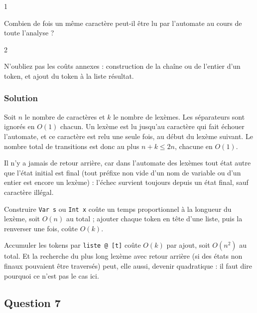 \documentclass[11pt,a4paper]{article}
\newcommand{\equationajustee}[1]{%
  \sbox{\boiteequation}{$\displaystyle #1$}%
  \ifdim\wd\boiteequation>\linewidth
    \[\resizebox{\linewidth}{!}{\usebox{\boiteequation}}\]%
  \else
    \[#1\]%
  \fi}
\begin{document}
\begin{indication}{1}

Combien de fois un même caractère peut-il être lu par l'automate au cours de toute l'analyse ?

\end{indication}

\begin{indication}{2}

N'oubliez pas les coûts annexes : construction de la chaîne ou de l'entier d'un token, et ajout du token à la liste résultat.

\end{indication}

\hypertarget{solution-5}{%
\subsubsection{Solution}\label{solution-5}}

Soit \(n\) le nombre de caractères et \(k\) le nombre de lexèmes. Les séparateurs sont ignorés en \(O(1)\) chacun. Un lexème est lu jusqu'au caractère qui fait échouer l'automate, et ce caractère est relu une seule fois, au début du lexème suivant. Le nombre total de transitions est donc au plus \(n + k \le 2n\), chacune en \(O(1)\).

Il n'y a jamais de retour arrière, car dans l'automate des lexèmes tout état autre que l'état initial est final (tout préfixe non vide d'un nom de variable ou d'un entier est encore un lexème) : l'échec survient toujours depuis un état final, sauf caractère illégal.

Construire \texttt{Var\ s} ou \texttt{Int\ x} coûte un temps proportionnel à la longueur du lexème, soit \(O(n)\) au total ; ajouter chaque token en tête d'une liste, puis la renverser une fois, coûte \(O(k)\).

\equationajustee{\boxed{\,\text{L'analyse lexicale est en } \Theta(n).\,}}

\begin{piege}

Accumuler les tokens par \texttt{liste\ @\ {[}t{]}} coûte \(O(k)\) par ajout, soit \(O(n^2)\) au total. Et la recherche du plus long lexème avec retour arrière (si des états non finaux pouvaient être traversés) peut, elle aussi, devenir quadratique : il faut dire pourquoi ce n'est pas le cas ici.

\end{piege}

\hypertarget{question-7}{%
\subsection{Question 7}\label{question-7}}
\end{document}
